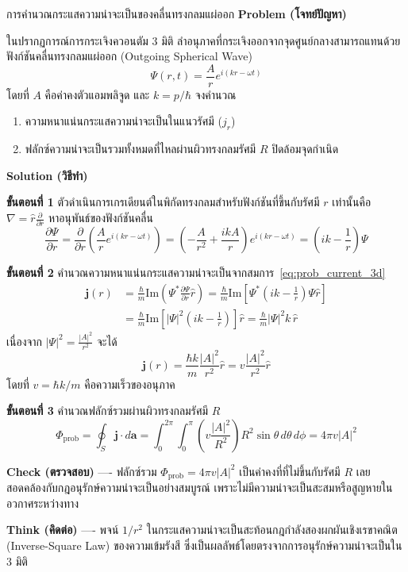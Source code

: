 \begin{psctbox}{การคำนวณกระแสความน่าจะเป็นของคลื่นทรงกลมแผ่ออก}
\textbf{Problem (โจทย์ปัญหา)}

ในปรากฏการณ์การกระเจิงควอนตัม 3 มิติ ลำอนุภาคที่กระเจิงออกจากจุดศูนย์กลางสามารถแทนด้วยฟังก์ชันคลื่นทรงกลมแผ่ออก (Outgoing Spherical Wave)
\begin{equation*}
\Psi(r, t) = \frac{A}{r} e^{i(kr - \omega t)}
\end{equation*}
โดยที่ $A$ คือค่าคงตัวแอมพลิจูด และ $k = p/\hbar$ จงคำนวณ
\begin{enumerate}
    \item ความหนาแน่นกระแสความน่าจะเป็นในแนวรัศมี ($j_r$)
    \item ฟลักซ์ความน่าจะเป็นรวมทั้งหมดที่ไหลผ่านผิวทรงกลมรัศมี $R$ ปิดล้อมจุดกำเนิด
\end{enumerate}

\textbf{Solution (วิธีทำ)}

\textbf{ขั้นตอนที่ 1} ตัวดำเนินการเกรเดียนต์ในพิกัดทรงกลมสำหรับฟังก์ชันที่ขึ้นกับรัศมี $r$ เท่านั้นคือ $\nabla = \hat{r}\frac{\partial}{\partial r}$
หาอนุพันธ์ของฟังก์ชันคลื่น
\begin{equation*}
\frac{\partial \Psi}{\partial r} = \frac{\partial}{\partial r}\left( \frac{A}{r} e^{i(kr - \omega t)} \right) = \left( -\frac{A}{r^2} + \frac{ikA}{r} \right) e^{i(kr - \omega t)} = \left( ik - \frac{1}{r} \right)\Psi
\end{equation*}

\textbf{ขั้นตอนที่ 2} คำนวณความหนาแน่นกระแสความน่าจะเป็นจากสมการ~\eqref{eq:prob_current_3d}
\begin{align*}
\mathbf{j}(r) &= \frac{\hbar}{m}\text{Im}\left( \Psi^* \frac{\partial \Psi}{\partial r}\hat{r} \right) = \frac{\hbar}{m}\text{Im}\left[ \Psi^* \left( ik - \frac{1}{r} \right)\Psi \hat{r} \right] \\
&= \frac{\hbar}{m}\text{Im}\left[ |\Psi|^2 \left( ik - \frac{1}{r} \right) \right] \hat{r} = \frac{\hbar}{m} |\Psi|^2 k \, \hat{r}
\end{align*}
เนื่องจาก $|\Psi|^2 = \frac{|A|^2}{r^2}$ จะได้
\begin{equation*}
\mathbf{j}(r) = \frac{\hbar k}{m} \frac{|A|^2}{r^2} \hat{r} = v \frac{|A|^2}{r^2} \hat{r}
\end{equation*}
โดยที่ $v = \hbar k/m$ คือความเร็วของอนุภาค

\textbf{ขั้นตอนที่ 3} คำนวณฟลักซ์รวมผ่านผิวทรงกลมรัศมี $R$
\begin{equation*}
\Phi_{\text{prob}} = \oint_{S} \mathbf{j}\cdot d\mathbf{a} = \int_{0}^{2\pi}\int_{0}^{\pi} \left( v \frac{|A|^2}{R^2} \right) R^2 \sin\theta \, d\theta \, d\phi = 4\pi v |A|^2
\end{equation*}

\textbf{Check (ตรวจสอบ)} ---- ฟลักซ์รวม $\Phi_{\text{prob}} = 4\pi v |A|^2$ เป็นค่าคงที่ที่ไม่ขึ้นกับรัศมี $R$ เลย สอดคล้องกับกฎอนุรักษ์ความน่าจะเป็นอย่างสมบูรณ์ เพราะไม่มีความน่าจะเป็นสะสมหรือสูญหายในอวกาศระหว่างทาง

\textbf{Think (คิดต่อ)} ---- พจน์ $1/r^2$ ในกระแสความน่าจะเป็นสะท้อนกฎกำลังสองผกผันเชิงเรขาคณิต (Inverse-Square Law) ของความเข้มรังสี ซึ่งเป็นผลลัพธ์โดยตรงจากการอนุรักษ์ความน่าจะเป็นใน 3 มิติ
\end{psctbox}

